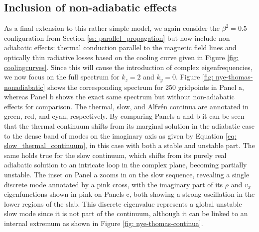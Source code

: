 \subsection{Inclusion of non-adiabatic effects} \label{ss: non_adiabatic_effects}
As a final extension to this rather simple model, we again consider the $\beta^2 = 0.5$ configuration from Section \ref{ss: parallel_propagation} but now include non-adiabatic effects: thermal conduction parallel to the magnetic field lines and optically thin radiative losses based on the {\spexdm} cooling curve given in Figure \ref{fig: coolingcurves}. Since this will cause the introduction of complex eigenfrequencies, we now focus on the full spectrum for $k_z = 2$ and $k_y = 0$. Figure \ref{fig: nye-thomas-nonadiabatic} shows the corresponding spectrum for 250 gridpoints in Panel a, whereas Panel b shows the exact same spectrum but without non-adiabatic effects for comparison. The thermal, slow, and Alfv\'en continua are annotated in green, red, and cyan, respectively. By comparing Panels a and b it can be seen that the thermal continuum shifts from its marginal solution in the adiabatic case to the dense band of modes on the imaginary axis as given by Equation \eqref{eq: slow_thermal_continuum}, in this case with both a stable and unstable part. The same holds true for the slow continuum, which shifts from its purely real adiabatic solution to an intricate loop in the complex plane, becoming partially unstable. The inset on Panel a zooms in on the slow sequence, revealing a single discrete mode annotated by a pink cross, with the imaginary part of its $\rho$ and $v_x$ eigenfunctions shown in pink on Panels c, both showing a strong oscillation in the lower regions of the slab. This discrete eigenvalue represents a global unstable slow mode since it is not part of the continuum, although it can be linked to an internal extremum as shown in Figure \ref{fig: nye-thomas-continua}.

